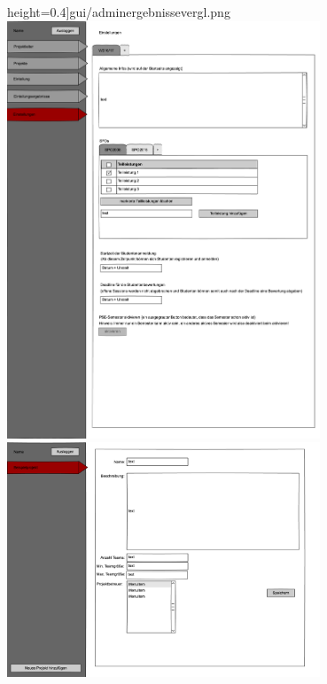 \documentclass[parskip=full]{scrartcl}
\begin{document}
\begin{enumerate}
{height=0.4\textheight]{gui/adminergebnissevergl.png}
\medskip
\includegraphics[width=0.7\textwidth,
height=0.7\textheight]{gui/adminproperties.png}
\medskip
\includegraphics[width=0.7\textwidth,
height=0.4\textheight]{gui/projleiterprojekte.png}
\medskip
}
\end{enumerate}
\pagebreak
\printglossaries
\end{document}

